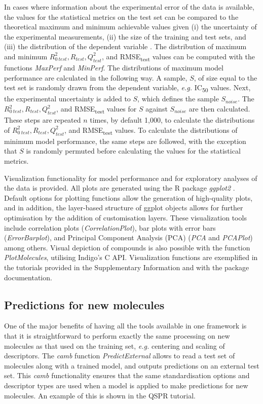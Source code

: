 \documentclass[twoside,a4wide,10pt]{article}
\begin{document}
In cases where information about the experimental error of the data is available,
the values for the statistical metrics on the test set
can be compared to the theoretical maximum and minimum achievable values given 
(i) the uncertainty of the experimental measurements,
(ii) the size of the training and test sets,
and (iii) the distribution of the dependent variable \citep{cortesGP,NCI60}.
The distribution of maximum and minimum $R_{0\:test}^2, R_{test}, Q^{2}_{test}$, and RMSE\textsubscript{test} 
values can be computed with the functions {\it MaxPerf} and {\it MinPerf}.
The distributions of maximum model performance are calculated in the following way.
A sample, $S$, of size equal to the test set is randomly drawn from the dependent variable, {\it e.g.} IC\textsubscript{50} values.
Next, the experimental uncertainty is added to $S$, 
which defines the sample $S_{noise}$.
The $R_{0\:test}^2, R_{test}, Q^{2}_{test}$, and RMSE\textsubscript{test} values
for $S$ against $S_{noise}$ are then calculated.
These steps are repeated $n$ times, by default 1,000, to calculate
the distributions of $R_{0\:test}^2, R_{test}, Q^{2}_{test}$, and RMSE\textsubscript{test} values.
To calculate the distributions of minimum model performance,
the same steps are followed, with the exception that $S$ is randomly
permuted before calculating the values for the statistical metrics.

Visualization functionality for model performance and for exploratory analyses of the data is provided. 
All plots are generated using the R package {\it ggplot2} \citep{ggplot2}.
Default options for plotting functions allow the generation of high-quality plots,
and in addition, the layer-based structure of ggplot objects allows for further optimisation
by the addition of customisation layers.  
These visualization tools include correlation plots ({\it CorrelationPlot}),
bar plots with error bars ({\it ErrorBarplot}), and
Principal Component Analysis (PCA) ({\it PCA} and {\it PCAPlot}) among others.
Visual depiction of compounds is also possible with the function {\it PlotMolecules},
utilising Indigo's C API. 
Visualization functions are exemplified in the tutorials provided in the Supplementary Information
and with the package documentation.

\subsection{Predictions for new molecules}
One of the major benefits of having all the tools available in one framework is that 
it is straightforward to perform exactly the same processing on new molecules as that used on the training set,
{\it e.g.} centering and scaling of descriptors.
The {\it camb} function {\it PredictExternal} allows to read a test set of molecules along with a trained model, 
and outputs predictions on an external test set. 
This {\it camb} functionality 
ensures that the same standardisation options and descriptor types are used when a model is applied to make predictions for new molecules.
An example of this is shown in the QSPR tutorial.
\end{document}
